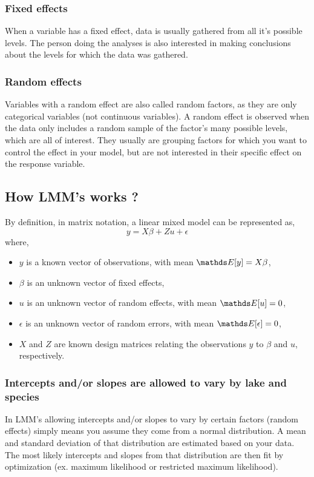\documentclass{article}
\begin{document}
\subsubsection{Fixed effects}
When a variable has a fixed effect, data is usually gathered from all it's possible levels. The person doing the analyses is also interested in making conclusions about the levels for which the data was gathered.
\subsubsection{Random effects}
Variables with a random effect are also called random factors, as they are only categorical variables (not continuous variables). A random effect is observed when the data only includes a random sample of the factor's many possible levels, which are all of interest. They usually are grouping factors for which you want to control the effect in your model, but are not interested in their specific effect on the response variable.

\subsection{How LMM's works ?}
By definition, in matrix notation, a linear mixed model can be represented as, 
\begin{equation*}
    y = X \beta + Z u + \epsilon
\end{equation*}
where,
\begin{itemize}
    \item $y$ is  a known vector of observations, with mean $\bbE[y]=X \beta$,
    \item $\beta$ is an unknown vector of fixed effects,
    \item $u$ is an unknown vector of random effects, with mean $\bbE[u] = 0$,
    \item $\epsilon$ is an unknown vector of random errors, with mean $\bbE[\epsilon]=0$,
    \item $X$ and $Z$ are known design matrices relating the observations $y$ to $\beta$ and $u$,  respectively.
\end{itemize}

\subsubsection{ Intercepts and/or slopes are allowed to vary by lake and species}
In LMM's allowing intercepts and/or slopes to vary by certain factors (random effects) simply means you assume they come from a normal distribution. A mean and standard deviation of that distribution are estimated based on your data. The most likely intercepts and slopes from that distribution are then fit by optimization (ex. maximum likelihood or restricted maximum likelihood).
\end{document}
